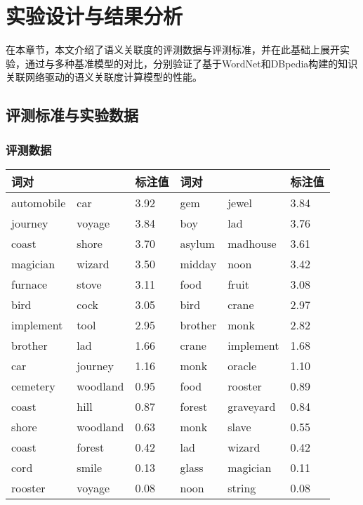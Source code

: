 \chapter{实验设计与结果分析}
\label{chap:chap05}

在本章节，本文介绍了语义关联度的评测数据与评测标准，并在此基础上展开实验，通过与多种基准模型的对比，分别验证了基于WordNet和DBpedia构建的知识关联网络驱动的语义关联度计算模型的性能。

\section{评测标准与实验数据}
\subsection{评测数据}

\begin{table*}[htbp]
    \center
    \vspace{5pt}
    \begin{tabular}{p{2cm}p{2cm}p{1.4cm}p{2cm}p{2cm}p{1.4cm}}
    \hline
    \multicolumn{2}{l}{词对}     & 标注值          & \multicolumn{2}{l}{词对}     & 标注值  \\ \hline
    automobile    &    car    &    3.92 & gem    &    jewel    &    3.84  \\ \hline 
    journey    &    voyage    &    3.84 & boy    &    lad    &    3.76  \\ \hline 
    coast    &    shore    &    3.70 & asylum    &    madhouse    &    3.61  \\ \hline 
    magician    &    wizard    &    3.50 & midday    &    noon    &    3.42  \\ \hline 
    furnace    &    stove    &    3.11 & food    &    fruit    &    3.08  \\ \hline 
    bird    &    cock    &    3.05 & bird    &    crane    &    2.97  \\ \hline 
    implement    &    tool    &    2.95 & brother    &    monk    &    2.82  \\ \hline 
    brother    &    lad    &    1.66 & crane    &    implement    &    1.68  \\ \hline 
    car    &    journey    &    1.16 & monk    &    oracle    &    1.10  \\ \hline 
    cemetery    &    woodland    &    0.95 & food    &    rooster    &    0.89  \\ \hline 
    coast    &    hill    &    0.87 & forest    &    graveyard    &    0.84  \\ \hline 
    shore    &    woodland    &    0.63 & monk    &    slave    &    0.55  \\ \hline 
    coast    &    forest    &    0.42 & lad    &    wizard    &    0.42  \\ \hline 
    cord    &    smile    &    0.13 & glass    &    magician    &    0.11  \\ \hline 
    rooster    &    voyage    &    0.08 & noon    &    string    &    0.08  \\ \hline 
    \end{tabular}
    \label{mc30}
\end{table*}

